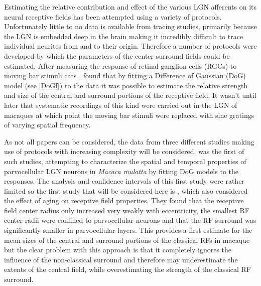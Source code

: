 Estimating the relative contribution and effect of the various LGN
afferents on its neural receptive fields has been attempted using a
variety of protocols. Unfortunately little to no data is available
from tracing studies, primarily because the LGN is embedded deep in
the brain making it incredibly difficult to trace individual neurites
from and to their origin. Therefore a number of protocols were
developed by which the parameters of the center-surround fields could
be estimated. After measuring the response of retinal ganglion cells
(RGCs) to moving bar stimuli cats \citep{Rodieck1965a,Rodieck1965b},
\cite{Rodieck1965} found that by fitting a Difference of Gaussian
(DoG) model (see \ref{DoGf}) to the data it was possible to estimate
the relative strength and size of the central and surround portions of
the receptive field. It wasn't until later that systematic recordings
of this kind were carried out in the LGN of macaques at which point
the moving bar stimuli were replaced with sine gratings of varying
spatial frequency.

As not all papers can be considered, the data from three different
studies making use of protocols with increasing complexity will be
considered. \cite{Derrington1984} was the first of such studies,
attempting to characterize the spatial and temporal properties of
parvocellular LGN neurons in \emph{Macaca mulatta} by fitting DoG
models to the responses. The analysis and confidence intervals of this
first study were rather limited so the first study that will be
considered here is \cite{Spear1994}, which also considered the effect
of aging on receptive field properties. They found that the receptive
field center radius only increased very weakly with eccentricity, the
smallest RF center radii were confined to parvocellular neurons and
that the RF surround was significantly smaller in parvocellular
layers. This provides a first estimate for the mean sizes of the
central and surround portions of the classical RFs in macaque but the
clear problem with this approach is that it completely ignores the
influence of the non-classical surround and therefore may
underestimate the extents of the central field, while overestimating
the strength of the classical RF surround.

